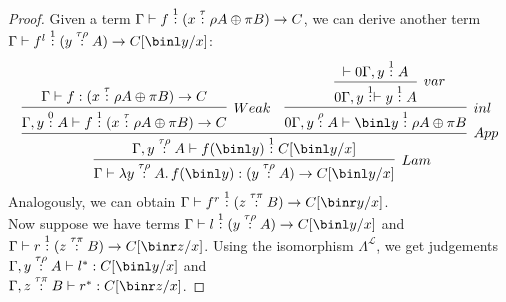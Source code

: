 \documentclass[12pt,a4paper]{article}
\begin{document}
\begin{proof}
  Given a term $\Gamma \vdash f \overset{1}{:} (x \overset{\tau}{:} \rho A \oplus \pi B) \to C$, we can derive another term\\ $\Gamma \vdash f^l \of{1} ( y \of {\tau \rho} A) \to C[\binl y /x]$:
  $$
  \infer[Lam]{\Gamma \vdash \lambda y \of{\tau\rho} A .\, f (\binl y) : (y \of {\tau \rho} A) \to C[\binl y / x]}{
    \infer[App]{\Gamma , y \of{\tau\rho} A \vdash f(\binl y) \of{1} C[\binl y /x] }{
      \infer[Weak]{\Gamma , y \of{0} A \vdash f \of{1} (x \of\tau \rho A \oplus \pi B) \to C}{
        \Gamma \vdash f : (x \of \tau \rho A \oplus \pi B) \to C
      }
      &
      \infer[inl]{0\Gamma, y \of\rho A \vdash \binl y \of{1}\rho A \oplus \pi B}{
        \infer[var]{0\Gamma, y \of{1} \vdash y \of{1} A}{
          \vdash 0\Gamma, y \of{1} A
        }
      }
    }
  }
  $$
  Analogously, we can obtain $\Gamma \vdash f^r \of{1} (z \of{\tau\pi} B) \to C[\binr y /x]$.\\
  Now suppose we have terms $\Gamma \vdash l \of{1} (y \of{\tau \rho} A) \to C[\binl y /x]$ and $\Gamma \vdash r \of{1} (z \of{\tau \pi} B) \to C[\binr z / x]$. Using the isomorphism $\Lambda^\mathcal{L}$, we get judgements $ \Gamma, y \of{\tau \rho} A \vdash l^* : C[\binl y / x]$ and\\ $\Gamma , z \of {\tau \pi} B \vdash r^* : C[\binr z /x]$.
\end{proof}
\end{document}
